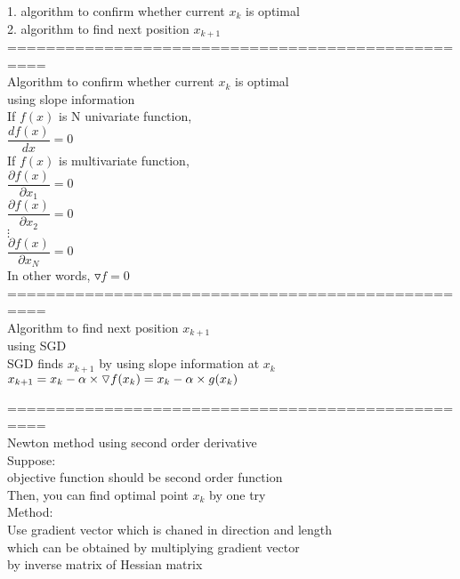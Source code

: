 \documentclass{article}
\begin{document}
1. algorithm to confirm whether current $x_k$ is optimal \\ 
2. algorithm to find next position $x_{k+1}$ \\ 

==================================================\\
Algorithm to confirm whether current $x_k$ is optimal \\ 
using slope information \\ 

If $f(x)$ is N univariate function, \\ 
$\dfrac{df(x)}{dx}=0$ \\ 

If $f(x)$ is multivariate function, \\ 
$\dfrac{\partial f(x)}{\partial x_1}=0$ \\ 
$\dfrac{\partial f(x)}{\partial x_2}=0$ \\ 
$\vdots$ \\ 
$\dfrac{\partial f(x)}{\partial x_N}=0$ \\ 

In other words, $\triangledown f=0$ \\

==================================================\\
Algorithm to find next position $x_{k+1}$ \\ 
using SGD \\ 

SGD finds $x_{k+1}$ by using slope information at $x_k$ \\ 

$x_{k+1} \\\\ 
=x_k - \alpha \times \triangledown f(x_k) \\\\ 
=x_k - \alpha \times g(x_k)$

==================================================\\
Newton method using second order derivative \\ 

Suppose: \\ 
objective function should be second order function \\ 
Then, you can find optimal point $x_k$ by one try \\ 

Method: \\ 
Use gradient vector which is chaned in direction and length \\ 
which can be obtained by multiplying gradient vector \\
by inverse matrix of Hessian matrix \\ 
\end{document}
